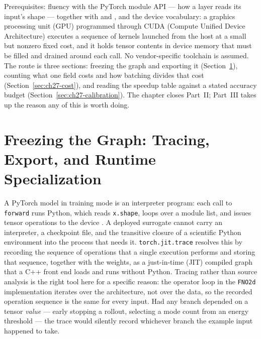 Prerequisites: fluency with the PyTorch module API --- how a layer
reads its input's shape --- together with 
and , and the device
vocabulary: a graphics processing unit (GPU) programmed through CUDA (Compute
Unified Device Architecture) executes a sequence of kernels launched from the host
at a small but nonzero fixed cost, and it holds tensor contents in device memory
that must be filled and drained around each call.
No vendor-specific toolchain
is assumed. The route is three sections: freezing the graph and exporting it
(Section~\ref{sec:ch27-export}), counting what one field costs and how batching
divides that cost (Section~\ref{sec:ch27-cost}), and reading the speedup table
against a stated accuracy budget (Section~\ref{sec:ch27-calibration}). The chapter
closes Part~II; Part~III takes up the reason any of this is worth doing.

\section{Freezing the Graph: Tracing, Export, and Runtime Specialization}
\label{sec:ch27-export}

A PyTorch model in training mode is an interpreter program: each call to
\texttt{forward} runs Python, which reads \texttt{x.shape}, loops over a module
list, and issues tensor operations to the device \cite{paszke2019pytorch}. A
deployed surrogate cannot carry an interpreter, a checkpoint file, and the
transitive closure of a scientific Python environment into the process that
needs it. \texttt{torch.jit.trace} resolves this by recording the sequence of
operations that a single execution performs and storing that sequence, together
with the weights, as a just-in-time (JIT) compiled graph that a C++ front end
loads and runs without Python. Tracing rather than source analysis is the right
tool here for a specific reason: the operator loop in the
\texttt{FNO2d} implementation iterates over the architecture, not over the data,
so the recorded operation sequence is the same for every input. Had any branch
depended on a tensor \emph{value} --- early stopping a rollout, selecting a mode
count from an energy threshold --- the trace would silently record whichever
branch the example input happened to take.

